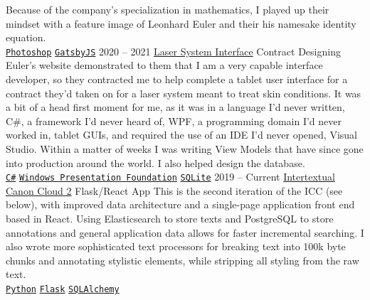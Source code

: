 \documentclass[9pt]{developercv} %
\begin{document}
\begin{entrylist}
{            Because of the company's specialization in mathematics, I played up
            their mindset with a feature image of Leonhard Euler and their
            his namesake identity equation.
            \\
            \texttt{{\href{https://www.adobe.com/products/photoshop.html}{Photoshop}}}\slashsep
            \texttt{{\href{https://www.gatsbyjs.org/}{GatsbyJS}}}
        }
    \entry
        {2020 -- 2021}
        {\href{https://euler-sci.com}{Laser System Interface}}
        {Contract}
        {
            Designing Euler's website demonstrated to them that I am a very
            capable interface developer, so they contracted me to help complete
            a tablet user interface for a contract they'd taken on for a laser
            system meant to treat skin conditions. It was a bit of a head first
            moment for me, as it was in a language I'd never written, C\#, a
            framework I'd never heard of, WPF, a programming domain I'd never
            worked in, tablet GUIs, and required the use of an IDE I'd never
            opened, Visual Studio. Within a matter of weeks I was writing View
            Models that have since gone into production around the world. I also
            helped design the database.
            \\
            \texttt{{\href{https://en.wikipedia.org/wiki/C_Sharp_(programming_language)}{C\#}}}\slashsep
            \texttt{{\href{https://en.wikipedia.org/wiki/Windows_Presentation_Foundation}{Windows Presentation Foundation}}}\slashsep
            \texttt{{\href{https://www.sqlite.org/index.html}{SQLite}}}\slashsep
        }
    \entry
        {2019 -- Current}
        {{\href{https://github.com/Anno-Wiki}{Intertextual Canon Cloud 2}}}
        {Flask/React App}
        {
            This is the second iteration of the ICC (see below), with improved
            data architecture and a single-page application front end based in
            React. Using Elasticsearch to store texts and PostgreSQL to store
            annotations and general application data allows for faster
            incremental searching. I also wrote more sophisticated text
            processors for breaking text into 100k byte chunks and annotating
            stylistic elements, while stripping all styling from the raw text.
        \\
        \texttt{{\href{https://www.python.org/}{Python}}}\slashsep
        \texttt{{\href{https://flask.palletsprojects.com/en/1.1.x/}{Flask}}}\slashsep
        \texttt{{\href{https://www.sqlalchemy.org/}{SQLAlchemy}}}\slashsep
}
\end{entrylist}
\end{document}
